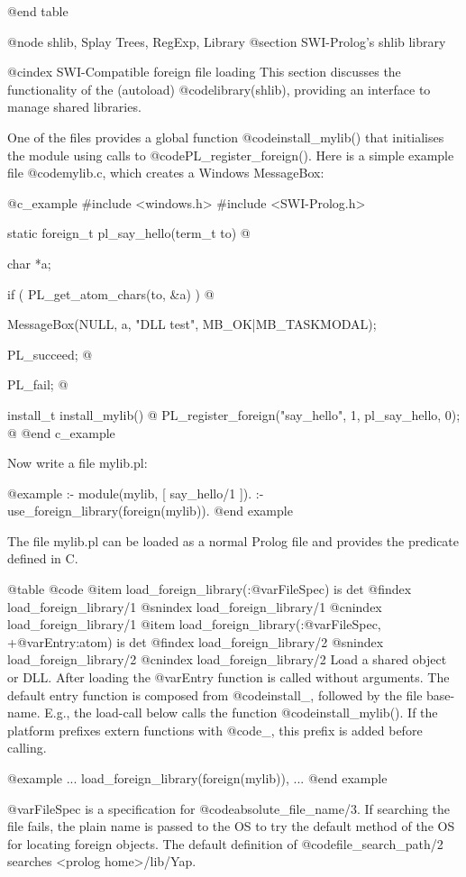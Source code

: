 @end table

@node shlib, Splay Trees, RegExp, Library
@section SWI-Prolog's shlib library

@cindex SWI-Compatible foreign file loading
This section discusses the functionality of the (autoload)
@code{library(shlib)}, providing an interface to manage shared
libraries.

One of the files provides a global function @code{install_mylib()} that
initialises the module using calls to @code{PL_register_foreign()}. Here is a
simple example file @code{mylib.c}, which creates a Windows MessageBox:

@c_example
#include <windows.h>
#include <SWI-Prolog.h>

static foreign_t
pl_say_hello(term_t to)
@{ char *a;

  if ( PL_get_atom_chars(to, &a) )
  @{ MessageBox(NULL, a, "DLL test", MB_OK|MB_TASKMODAL);

    PL_succeed;
  @}

  PL_fail;
@}

install_t
install_mylib()
@{ PL_register_foreign("say_hello", 1, pl_say_hello, 0);
@}
@end c_example

Now write a file mylib.pl:

@example
:- module(mylib, [ say_hello/1 ]).
:- use_foreign_library(foreign(mylib)).
@end example

The file mylib.pl can be loaded as a normal Prolog file and provides the predicate defined in C.

@table @code
@item load_foreign_library(:@var{FileSpec}) is det
@findex load_foreign_library/1
@snindex load_foreign_library/1
@cnindex load_foreign_library/1
@item load_foreign_library(:@var{FileSpec}, +@var{Entry}:atom) is det
@findex load_foreign_library/2
@snindex load_foreign_library/2
@cnindex load_foreign_library/2
    Load a shared object or DLL. After loading the @var{Entry} function is
    called without arguments. The default entry function is composed
    from @code{install_}, followed by the file base-name. E.g., the
    load-call below calls the function @code{install_mylib()}. If the platform
    prefixes extern functions with @code{_}, this prefix is added before
    calling.

@example
          ...
          load_foreign_library(foreign(mylib)),
          ...
@end example

    @var{FileSpec} is a specification for
    @code{absolute_file_name/3}. If searching the file fails, the plain
    name is passed to the OS to try the default method of the OS for
    locating foreign objects. The default definition of
    @code{file_search_path/2} searches <prolog home>/lib/Yap.

